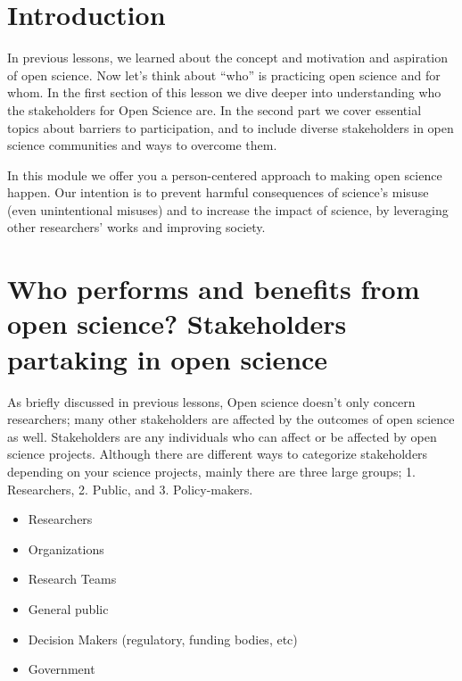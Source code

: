 \documentclass[
  letterpaper,
  DIV=11,
  numbers=noendperiod]{scrreport}
\providecommand{\tightlist}{%
  \setlength{\itemsep}{0pt}\setlength{\parskip}{0pt}}\usepackage{longtable,booktabs,array}
\begin{document}
\hypertarget{introduction-2}{%
\section{Introduction}\label{introduction-2}}

In previous lessons, we learned about the concept and motivation and
aspiration of open science. Now let's think about ``who'' is practicing
open science and for whom. In the first section of this lesson we dive
deeper into understanding who the stakeholders for Open Science are. In
the second part we cover essential topics about barriers to
participation, and to include diverse stakeholders in open science
communities and ways to overcome them.

In this module we offer you a person-centered approach to making open
science happen. Our intention is to prevent harmful consequences of
science's misuse (even unintentional misuses) and to increase the impact
of science, by leveraging other researchers' works and improving
society.

\hypertarget{who-performs-and-benefits-from-open-science-stakeholders-partaking-in-open-science}{%
\section{Who performs and benefits from open science? Stakeholders
partaking in open
science}\label{who-performs-and-benefits-from-open-science-stakeholders-partaking-in-open-science}}

As briefly discussed in previous lessons, Open science doesn't only
concern researchers; many other stakeholders are affected by the
outcomes of open science as well. Stakeholders are any individuals who
can affect or be affected by open science projects. Although there are
different ways to categorize stakeholders depending on your science
projects, mainly there are three large groups; 1. Researchers, 2.
Public, and 3. Policy-makers.

\begin{itemize}
\tightlist
\item
  Researchers
\item
  Organizations
\item
  Research Teams
\item
  General public
\item
  Decision Makers (regulatory, funding bodies, etc)
\item
  Government
\end{itemize}
\end{document}
